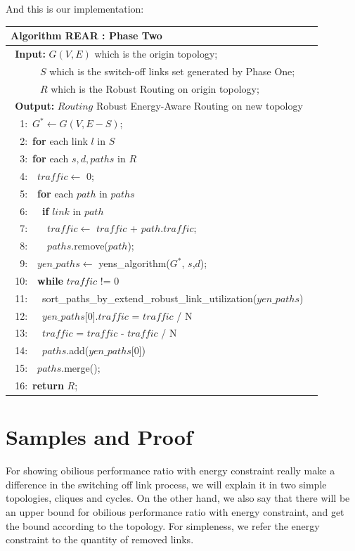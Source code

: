 \documentclass[conference]{IEEEtran}
\begin{document}
And this is our implementation:
\begin{table}[!th]
\begin{tabular}{ll}
\hline
\textbf{Algorithm REAR : Phase Two}\\
\hline
$\:\:$\textbf{Input:} $G(V,E)$ which is the origin topology;\\
$\quad\quad\ \ \ $ $S$ which is the switch-off links set generated by Phase One;\\
$\quad\quad\ \ \ $ $R$ which is the Robust Routing on origin topology;\\
$\:\:$\textbf{Output:} $Routing$ Robust Energy-Aware Routing on new topology\\
$\:\:$\ 1:\ $G^* \leftarrow G(V, E-S)$;\\
$\:\:$\ 2:\ \textbf{for} {each link $l$ in $S$}\\
$\:\:$\ 3:\quad\ \textbf{for} {each $s,d,paths$ in $R$}\\
$\:\:$\ 4:\quad\ \quad\ $traffic \leftarrow$ 0;\\
$\:\:$\ 5:\quad\ \quad\ \textbf{for} {each $path$ in $paths$}\\
$\:\:$\ 6:\quad\ \quad\ \quad\ \textbf{if} {$link$ in $path$}\\
$\:\:$\ 7:\quad\ \quad\ \quad\ \quad\ $traffic \leftarrow$ $traffic$ + $path$.$traffic$; \\
$\:\:$\ 8:\quad\ \quad\ \quad\ \quad\ $paths$.remove($path$); \\
$\:\:$\ 9:\quad\ \quad\ $yen\_paths \leftarrow$ yens\_algorithm($G^*$, $s$,$d$);\\
$\:\:$10:\quad\ \quad\ \textbf{while} {$traffic$ != 0}\\
$\:\:$11:\quad\ \quad\ \quad\ sort\_paths\_by\_extend\_robust\_link\_utilization($yen\_paths$)\\
$\:\:$12:\quad\ \quad\ \quad\ $yen\_paths$[0].$traffic$ = $traffic$ / N\\
$\:\:$13:\quad\ \quad\ \quad\ $traffic$ = $traffic$ - $traffic$ / N\\
$\:\:$14:\quad\ \quad\ \quad\ $paths$.add($yen\_paths$[0])\\
$\:\:$15:\quad\ \quad\ $paths$.merge();\\
$\:\:$16:\ \textbf{return} $R$;\\
\hline
\end{tabular}
\end{table}


\section{Samples and Proof}
For showing obilious performance ratio with energy constraint really make a difference in the switching off link 
process, we will explain it in two simple topologies, cliques and cycles. On the other hand, we also say that
there will be an upper bound for obilious performance ratio with energy constraint, and get the bound according
to the topology. For simpleness, we refer the energy constraint to the quantity of removed links.
\end{document}

